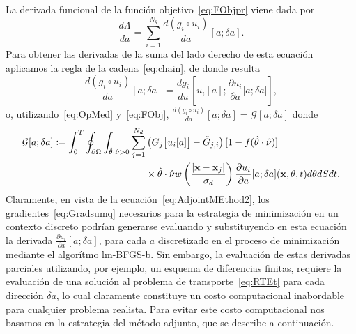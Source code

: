 La derivada funcional de la función objetivo~\eqref{eq:FObjpr} viene 
dada por
\begin{equation}
  \frac{d \Lambda}{da} = \sum_{i=1}^{N_q} \frac{d (g_i\circ
    u_i)}{da}[a;\delta a].
\label{eq:Gradsumq}
\end{equation}
Para obtener las derivadas de la suma del lado derecho 
de esta ecuación aplicamos la regla de la cadena~\eqref{eq:chain}, 
de donde resulta  
\begin{equation}
\frac{d (g_i\circ u_i)}{da}[a;\delta a] = \frac{d g_i}{
    d u}\left[u_i[a];\frac{\partial u_i}{\partial a} \big[a;\delta
    a\big]\right],
  \label{eq:AdjointMEthod}
\end{equation} 
o, utilizando~\eqref{eq:OpMed} y~\eqref{eq:FObj}, $\frac{d (g_i\circ u_i)}{da}[a;\delta a]=\mathcal{G}[a;\delta a]$ donde
\begin{equation}
\begin{split}
\begin{aligned}
  \mathcal{G}[a;\delta a]\coloneqq 
  \int_0^T \oint_{\partial \Omega} \int_{\hat{\theta} \cdot \hat{\nu}>0}
  \sum_{j=1}^{N_d} &\left( G_j\big[u_i[a]\big]-
    \tilde {G}_{j,i} \right) [1-f(\hat{\theta} \cdot \hat{\nu})]\\ 
   &\times \hat{\theta} \cdot \hat{\nu} w\left( \frac{ |\mathbf{x}-\mathbf{x}_j |}{\sigma_d}
  \right) \frac{\partial u_i}{\partial a}[a;\delta a](\mathbf{x},\theta,t)
  d\theta dS dt.
\end{aligned}
\end{split}
\label{eq:AdjointMEthod2}
\end{equation}
Claramente, en vista de la ecuación~\eqref{eq:AdjointMEthod2}, 
los gradientes~\eqref{eq:Gradsumq} necesarios para la estrategia 
de minimización en un contexto discreto podrían generarse 
evaluando y substituyendo en esta ecuación la derivada 
$\frac{\partial u_i}{\partial a}[a;\delta a]$, para cada $a$ 
discretizado en el proceso de minimización mediante el algorítmo lm-BFGS-b. 
Sin embargo, la evaluación de estas derivadas parciales utilizando, 
por ejemplo, un esquema de diferencias finitas, requiere la evaluación 
de una solución al problema de transporte~\eqref{eq:RTEt} para 
cada dirección $\delta a$, lo cual claramente constituye 
un costo computacional inabordable para cualquier problema realista. 
Para evitar este costo computacional nos basamos en la 
estrategia del método adjunto, que se describe a continuación.

